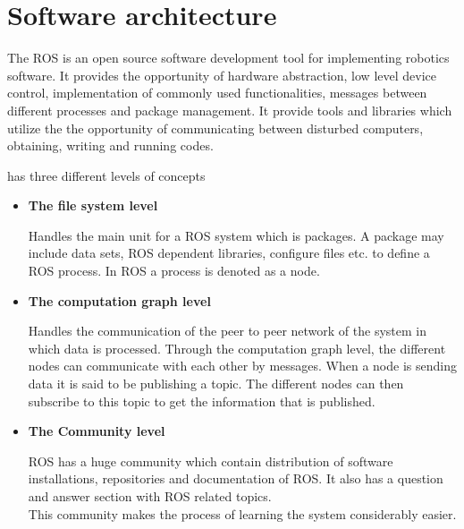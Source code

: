 \section{Software architecture}

The \gls{ROS} is an open source software development tool for implementing robotics software. It provides the opportunity of hardware abstraction, low level device control, implementation of commonly used functionalities, messages between different processes and package management\cite{wiki_ros}. It provide tools and libraries which utilize the the opportunity of communicating between disturbed computers, obtaining, writing and running codes.


 has three different levels of concepts\cite{Wiki_ros_concepts}

\begin{itemize}
\item \textbf{The file system level}

Handles the main unit for a ROS system which is packages. A package may include data sets, \gls{ROS} dependent libraries, configure files etc. to define a \gls{ROS} process. In \gls{ROS} a process is denoted as a node. 
\item \textbf{The computation graph level}

Handles the communication of the peer to peer network of the system in which data is processed. Through the computation graph level, the different nodes can communicate with each other by messages. When a node is sending data it is said to be publishing a topic. The different nodes can then subscribe to this topic to get the information that is published.
\item \textbf{The Community level}

ROS has a huge community which contain distribution of software installations, repositories and documentation of ROS. It also has a question and answer section with ROS related topics.\\
This community makes the process of learning the system considerably easier.
\end{itemize}




